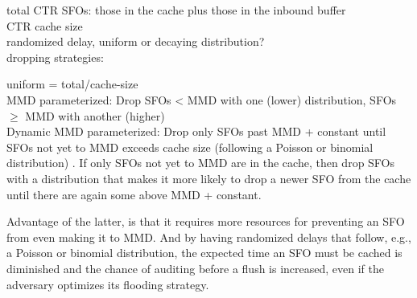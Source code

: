 total CTR SFOs: those in the cache plus those in the inbound buffer\\
CTR cache size\\
randomized delay, uniform or decaying distribution?\\

dropping strategies:

uniform = total/cache-size\\
MMD parameterized: Drop SFOs < MMD with one (lower) distribution,
SFOs $\geq$ MMD with another (higher)\\
Dynamic MMD parameterized: Drop only SFOs past MMD + constant until
SFOs not yet to MMD exceeds cache size (following a Poisson or
binomial distribution) . If only SFOs not yet to MMD are in the cache,
then drop SFOs with a distribution that makes it more likely
to drop a newer SFO from the cache until there are again some
above MMD + constant.

Advantage of the latter, is that it requires more resources for
preventing an SFO from even making it to MMD. And by having randomized
delays that follow, e.g., a Poisson or binomial distribution,
the expected time an SFO must be cached is diminished and the
chance of auditing before a flush is increased, even if
the adversary optimizes its flooding strategy.




